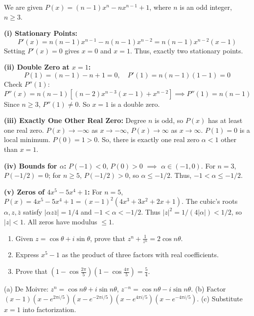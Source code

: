 \begin{solution}
We are given $P(x)=(n-1)x^n - nx^{n-1} + 1$, where $n$ is an odd integer, $n \ge 3$.

	\textbf{(i) Stationary Points:}
\[
P'(x) = n(n-1)x^{n-1} - n(n-1)x^{n-2} = n(n-1)x^{n-2}(x-1)
\]
Setting $P'(x)=0$ gives $x=0$ and $x=1$. Thus, exactly two stationary points.

	\textbf{(ii) Double Zero at $x=1$:}
\[
P(1) = (n-1) - n + 1 = 0,\quad P'(1) = n(n-1)(1-1) = 0
\]
Check $P''(1)$:
\[
P''(x) = n(n-1)[(n-2)x^{n-3}(x-1) + x^{n-2}]\implies P''(1) = n(n-1)
\]
Since $n\ge3$, $P''(1)\neq0$. So $x=1$ is a double zero.

	\textbf{(iii) Exactly One Other Real Zero:}
Degree $n$ is odd, so $P(x)$ has at least one real zero. $P(x)\to-\infty$ as $x\to-\infty$, $P(x)\to\infty$ as $x\to\infty$. $P(1)=0$ is a local minimum. $P(0)=1>0$. So, there is exactly one real zero $\alpha<1$ other than $x=1$.

	\textbf{(iv) Bounds for $\alpha$:}
$P(-1)<0$, $P(0)>0$ $\implies$ $\alpha\in(-1,0)$. For $n=3$, $P(-1/2)=0$; for $n\ge5$, $P(-1/2)>0$, so $\alpha\le-1/2$. Thus, $-1<\alpha\le-1/2$.

	\textbf{(v) Zeros of $4x^5-5x^4+1$:}
For $n=5$, $P(x) = 4x^5-5x^4+1 = (x-1)^2(4x^3+3x^2+2x+1)$. The cubic's roots $\alpha, z, \bar{z}$ satisfy $|\alpha z\bar{z}|=1/4$ and $-1<\alpha<-1/2$. Thus $|z|^2=1/(4|\alpha|)<1/2$, so $|z|<1$. All zeros have modulus $\le1$.
\end{solution}

\begin{problem}
\begin{enumerate}
    \item Given $z = \cos \theta + i \sin \theta$, prove that $z^n + \frac{1}{z^n} = 2 \cos n\theta$.
    \item Express $x^5 - 1$ as the product of three factors with real coefficients.
    \item Prove that $\left(1 - \cos\frac{2\pi}{5}\right) \left(1 - \cos\frac{4\pi}{5}\right) = \frac{5}{4}$.
\end{enumerate}
\end{problem}

\vspace{0.5cm}
\begin{hintbox}
(a) De Moivre: $z^n=\cos n\theta+i\sin n\theta$, $z^{-n}=\cos n\theta-i\sin n\theta$. (b) Factor $(x-1)(x-e^{2\pi i/5})(x-e^{-2\pi i/5})(x-e^{4\pi i/5})(x-e^{-4\pi i/5})$. (c) Substitute $x=1$ into factorization.
\end{hintbox}

